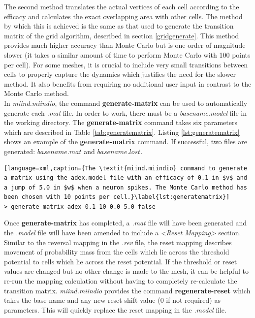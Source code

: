 \documentclass[utf8]{frontiersSCNS} %
\begin{document}
The second method translates the actual vertices of each cell according to the efficacy and calculates the exact overlapping area with other cells. The method by which this is achieved is the same as that used to generate the transition matrix of the grid algorithm, described in section \ref{gridgenerate}. This method provides much higher accuracy than Monte Carlo but is one order of magnitude slower (it takes a similar amount of time to perform Monte Carlo with 100 points per cell). For some meshes, it is crucial to include very small transitions between cells to properly capture the dynamics which justifies the need for the slower method. It also benefits from requiring no additional user input in contrast to the Monte Carlo method.\\

In \textit{miind.miindio}, the command \textbf{generate-matrix} can be used to automatically generate each \textit{.mat} file. In order to work, there must be a \textit{basename.model} file in the working directory. The \textbf{generate-matrix} command takes six parameters which are described in Table \ref{tab:generatematrix}. Listing \ref{lst:generatematrix} shows an example of the \textbf{generate-matrix} command. If successful, two files are generated: $basename.mat$ and $basename.lost$.

\begin{lstlisting}[language=xml,caption={The \textit{miind.miindio} command to generate a matrix using the adex.model file with an efficacy of 0.1 in $v$ and a jump of 5.0 in $w$ when a neuron spikes. The Monte Carlo method has been chosen with 10 points per cell.}\label{lst:generatematrix}]
> generate-matrix adex 0.1 10 0.0 5.0 false
\end{lstlisting}

Once \textbf{generate-matrix} has completed, a \textit{.mat} file will have been generated and the \textit{.model} file will have been amended to include a \textit{\textless Reset Mapping\textgreater} section. Similar to the reversal mapping in the \textit{.rev} file, the reset mapping describes movement of probability mass from the cells which lie across the threshold potential to cells which lie across the reset potential. If the threshold or reset values are changed but no other change is made to the mesh, it can be helpful to re-run the mapping calculation without having to completely re-calculate the transition matrix. \textit{miind.miindio} provides the command \textbf{regenerate-reset} which takes the base name and any new reset shift value (0 if not required) as parameters. This will quickly replace the reset mapping in the \textit{.model} file.
\end{document}

